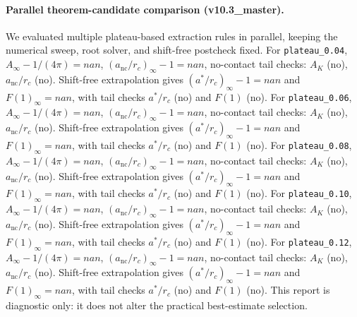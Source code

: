 \paragraph{Parallel theorem-candidate comparison (v10.3_master).}
We evaluated multiple plateau-based extraction rules in parallel, keeping the numerical sweep, root solver, and shift-free postcheck fixed. For \texttt{plateau_0.04}, $A_\infty-1/(4\pi)=nan$, $(a_{\mathrm{nc}}/r_c)_\infty-1=nan$, no-contact tail checks: $A_K$ (no), $a_{\mathrm{nc}}/r_c$ (no). Shift-free extrapolation gives $(a^*/r_c)_\infty-1=nan$ and $F(1)_\infty=nan$, with tail checks $a^*/r_c$ (no) and $F(1)$ (no). For \texttt{plateau_0.06}, $A_\infty-1/(4\pi)=nan$, $(a_{\mathrm{nc}}/r_c)_\infty-1=nan$, no-contact tail checks: $A_K$ (no), $a_{\mathrm{nc}}/r_c$ (no). Shift-free extrapolation gives $(a^*/r_c)_\infty-1=nan$ and $F(1)_\infty=nan$, with tail checks $a^*/r_c$ (no) and $F(1)$ (no). For \texttt{plateau_0.08}, $A_\infty-1/(4\pi)=nan$, $(a_{\mathrm{nc}}/r_c)_\infty-1=nan$, no-contact tail checks: $A_K$ (no), $a_{\mathrm{nc}}/r_c$ (no). Shift-free extrapolation gives $(a^*/r_c)_\infty-1=nan$ and $F(1)_\infty=nan$, with tail checks $a^*/r_c$ (no) and $F(1)$ (no). For \texttt{plateau_0.10}, $A_\infty-1/(4\pi)=nan$, $(a_{\mathrm{nc}}/r_c)_\infty-1=nan$, no-contact tail checks: $A_K$ (no), $a_{\mathrm{nc}}/r_c$ (no). Shift-free extrapolation gives $(a^*/r_c)_\infty-1=nan$ and $F(1)_\infty=nan$, with tail checks $a^*/r_c$ (no) and $F(1)$ (no). For \texttt{plateau_0.12}, $A_\infty-1/(4\pi)=nan$, $(a_{\mathrm{nc}}/r_c)_\infty-1=nan$, no-contact tail checks: $A_K$ (no), $a_{\mathrm{nc}}/r_c$ (no). Shift-free extrapolation gives $(a^*/r_c)_\infty-1=nan$ and $F(1)_\infty=nan$, with tail checks $a^*/r_c$ (no) and $F(1)$ (no). This report is diagnostic only: it does not alter the practical best-estimate selection.
